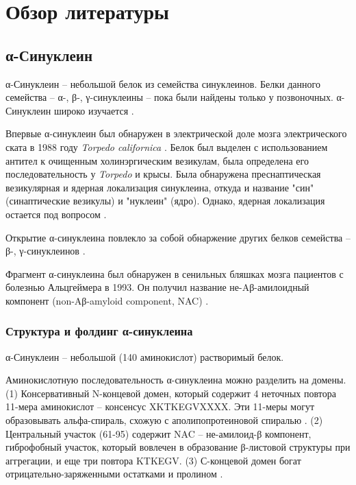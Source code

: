 \section{Обзор литературы}

\subsection{α-Синуклеин}

α-Синуклеин -- небольшой белок из семейства синуклеинов. Белки данного семейства -- α-,  β-,  γ-синуклеины -- пока были найдены только у позвоночных. α-Синуклеин широко изучается \cite{george_synucleins_2002, burre_cell_2018}.

Впервые α-синуклеин был обнаружен в электрической доле мозга электрического ската в 1988 году \textit{Torpedo californica} \cite{maroteaux_synuclein:_1988}. Белок был выделен с использованием антител к очищенным холинэргическим везикулам, была определена его последовательность у \textit{Torpedo} и крысы. Была обнаружена преснаптическая везикулярная и ядерная локализация синуклеина, откуда и название "син" (синаптические везикулы) и "нуклеин" (ядро). Однако, ядерная локализация остается под вопросом \cite{burre_cell_2018}.

Открытие α-синуклеина повлекло за собой обнаржение других белков семейства -- β-, γ-синуклеинов \cite{maroteaux_rat_1991}.

Фрагмент α-синуклеина был обнаружен в сенильных бляшках мозга пациентов с болезнью Альцгеймера в 1993. Он получил название не-Aβ-амилоидный компонент (non-Aβ-amyloid component, NAC) \cite{ueda_molecular_1993}.




\subsubsection{Структура и фолдинг α-синуклеина}


α-Синуклеин -- небольшой (140 аминокислот) растворимый белок.

Аминокислотную последовательность α-синуклеина можно разделить на домены. (1)  Консервативный N-концевой домен, который содержит 4 неточных повтора 11-мера  аминокислот -- консенсус XKTKEGVXXXX. Эти 11-меры могут образовывать альфа-спираль, схожую с аполипопротеиновой спиралью \cite{george_characterization_1995}. (2) Центральный участок (61-95) содержит NAC -- не-амилоид-β компонент, гиброфобный участок, который вовлечен в образование β-листовой структуры при аггрегации, и еще три повтора KTKEGV. (3) С-концевой домен богат отрицательно-заряженными остатками и пролином \cite{breydo_-synuclein_2012}.


